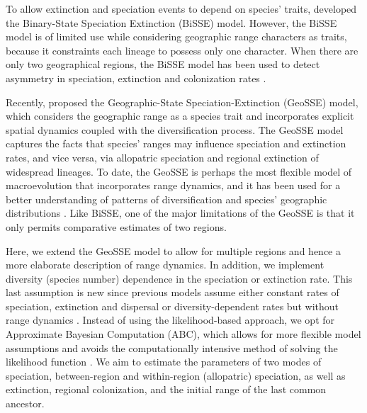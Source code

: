 To allow extinction and speciation events to depend on species’ traits, \citep{Maddison2007} developed the Binary-State Speciation Extinction (BiSSE) model. 
However, the BiSSE model is of limited use while considering geographic range characters as traits, because it constraints each lineage to possess only one character. 
When there are only two geographical regions, the BiSSE model has been used to detect asymmetry in speciation, extinction and colonization rates \citep{Valente2010, Anacker2011, Lancaster2013}. 

Recently, \citet{Goldberg2011} proposed the Geographic-State Speciation-Extinction (GeoSSE) model, which considers the geographic range as a species trait and incorporates explicit spatial dynamics coupled with the diversification process. 
The GeoSSE model captures the facts that species’ ranges may influence speciation and extinction rates, and vice versa, via allopatric speciation and regional extinction of widespread lineages. 
To date, the GeoSSE is perhaps the most flexible model of macroevolution that incorporates range dynamics, and it has been used for a better understanding of patterns of diversification and species’ geographic distributions \citep{Buerki2012, Bloom2013, Buerki2013, Jansson2013, Rolland2014}. 
Like BiSSE, one of the major limitations of the GeoSSE is that it only permits comparative estimates of two regions.

Here, we extend the GeoSSE model \citep{Goldberg2011} to allow for multiple regions and hence a more elaborate description of range dynamics. 
In addition, we implement diversity (species number) dependence in the speciation or extinction rate. 
This last assumption is new since previous models assume either constant rates of speciation, extinction and dispersal \citep{Stadler2013} or diversity-dependent rates but without range dynamics \citep{Rabosky2008, Etienne2012}. 
Instead of using the likelihood-based approach, we opt for Approximate Bayesian Computation (ABC), which allows for more flexible model assumptions and avoids the computationally intensive method of solving the likelihood function \citep{Toni2009, Beaumont2010, Sunnaker2013}. 
We aim to estimate the parameters of two modes of speciation, between-region and within-region (allopatric) speciation, as well as extinction, regional colonization, and the initial range of the last common ancestor.

